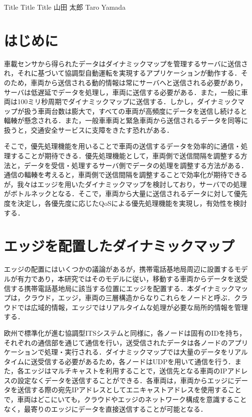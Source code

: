\documentclass[a4paper,10pt,twocolumn,uplatex]{jsarticle}
\date{1}
\begin{document}
{Title Title Title}
{山田 太郎}
{Taro Yamada}

\section{はじめに}
車載センサから得られたデータはダイナミックマップを管理するサーバに送信され，それに基づいて協調型自動運転を実現するアプリケーションが動作する．そのため，車両から送信される動的情報は常にサーバへと送信される必要があり，サーバは低遅延でデータを処理し，車両に送信する必要がある．また，一般に車両は100ミリ秒周期でダイナミックマップに送信する\cite{ITSinterval}．しかし，ダイナミックマップが扱う車両台数は膨大で，すべての車両が高頻度にデータを送信し続けると輻輳が懸念される．また，一般車車両と緊急車両から送信されるデータを同等に扱うと，交通安全サービスに支障をきたす恐れがある．\par
そこで，優先処理機能を用いることで車両の送信するデータを効率的に通信・処理することが期待できる．優先処理機能として，車両側で送信間隔を調整する方法と，データを受信・処理するサーバ側でデータの処理を調整する方法がある．通信の輻輳を考えると，車両側で送信間隔を調整することで効率化が期待できるが，我々はエッジを用いたダイナミックマップを検討しており，サーバでの処理がボトルネックとなる．そこで，車両から大量に送信されるデータに対して優先度を決定し，各優先度に応じたQoSによる優先処理機能を実現し，有効性を検討する．

\section{エッジを配置したダイナミックマップ}
エッジの配置にはいくつかの議論があるが，携帯電話基地局周辺に設置するモデルが有力であり，本研究ではそのモデルに従い，移動する車両からデータを送受信する携帯電話基地局に該当する位置にエッジを配置する．本ダイナミックマップは，クラウド，エッジ，車両の三層構造からなりこれらをノードと呼ぶ．クラウドでは広域的情報，エッジではリアルタイムな処理が必要な局所的情報を管理する．\par
欧州で標準化が進む協調型ITSシステムと同様に，各ノードは固有のIDを持ち，それぞれの通信部を通じて通信を行い，送受信されたデータは各ノードのアプリケーションで処理・実行される．ダイナミックマップでは大量のデータをリアルタイムに送受信する必要があるため，各ノードはUDPを用いて通信を行う．また，各エッジはマルチキャストを利用することで，送信先となる車両のIPアドレスの設定なくデータを送信することができる．各車両は，車両からエッジにデータを送信する際の宛先IPアドレスとしてエニキャストアドレスを使用することで，車両はどこにいても，クラウドやエッジのネットワーク構成を意識することなく，最寄りのエッジにデータを直接送信することが可能となる．
\end{document}
